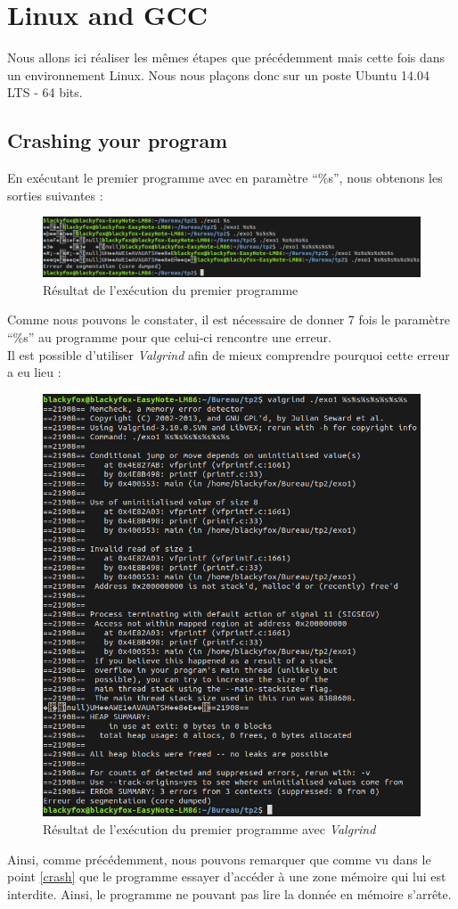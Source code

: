 \section{Linux and GCC}
Nous allons ici réaliser les mêmes étapes que précédemment mais cette fois dans un environnement Linux. Nous nous plaçons donc sur un poste Ubuntu 14.04 LTS - 64 bits.
\subsection{Crashing your program}
En exécutant le premier programme avec en paramètre \enquote{\%s}, nous obtenons les sorties suivantes :
\begin{figure}[H]
  \centering
  \includegraphics[width=.9\textwidth]{img/c1.png}
  \caption{Résultat de l'exécution du premier programme}
  \label{img:li:1}
\end{figure}
Comme nous pouvons le constater, il est nécessaire de donner 7 fois le paramètre \enquote{\%s} au programme pour que celui-ci rencontre une erreur.\\
Il est possible d'utiliser \textit{Valgrind} afin de mieux comprendre pourquoi cette erreur a eu lieu :
\begin{figure}[H]
  \centering
  \includegraphics[width=.9\textwidth]{img/c2.png}
  \caption{Résultat de l'exécution du premier programme avec \textit{Valgrind}}
  \label{img:li:2}
\end{figure}
Ainsi, comme précédemment, nous pouvons remarquer que comme vu dans le point \ref{crash} que le programme essayer d'accéder à une zone mémoire qui lui est interdite. Ainsi, le programme ne pouvant pas lire la donnée en mémoire s'arrête.

